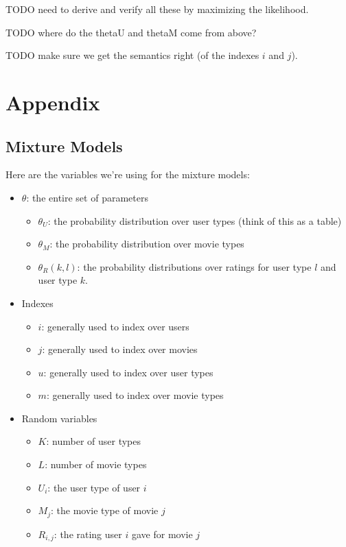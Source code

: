 \documentclass{article}
\begin{document}
TODO need to derive and verify all these by maximizing the likelihood.

TODO where do the thetaU and thetaM come from above?

TODO make sure we get the semantics right (of the indexes $i$ and $j$).

\section{Appendix}

\subsection{Mixture Models}

Here are the variables we're using for the mixture models:

\begin{itemize}
\item $\theta$: the entire set of parameters
  \begin{itemize}
  \item $\theta_U$: the probability distribution over user types (think
    of this as a table)
  \item $\theta_M$: the probability distribution over movie types
  \item $\theta_R(k,l)$: the probability distributions over ratings for user
    type $l$ and user type $k$.
  \end{itemize}
\item Indexes
  \begin{itemize}
  \item $i$: generally used to index over users
  \item $j$: generally used to index over movies
  \item $u$: generally used to index over user types
  \item $m$: generally used to index over movie types
  \end{itemize}
\item Random variables
  \begin{itemize}
  \item $K$: number of user types
  \item $L$: number of movie types
  \item $U_i$: the user type of user $i$
  \item $M_j$: the movie type of movie $j$
  \item $R_{i,j}$: the rating user $i$ gave for movie $j$
  \end{itemize}
\end{itemize}
\end{document}
